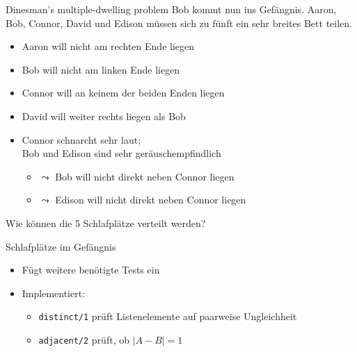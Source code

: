 \documentclass{beamer}
\newcommand{\code}[1]{
	\begin{mdframed}
		
	\end{mdframed}
}
\begin{document}
\begin{frame}{Dinesman's multiple-dwelling problem}
	Bob kommt nun ins Gefängnis.
	Aaron, Bob, Connor, David und Edison müssen sich zu fünft ein sehr breites Bett teilen.

	\begin{itemize}
		\item Aaron will nicht am rechten Ende liegen
		\item Bob will nicht am linken Ende liegen
		\item Connor will an keinem der beiden Enden liegen
		\item David will weiter rechts liegen als Bob
		\item Connor schnarcht sehr laut;\\Bob und Edison sind sehr geräuschempfindlich
		\begin{itemize}
			\item $\leadsto$ Bob will nicht direkt neben Connor liegen
			\item $\leadsto$ Edison will nicht direkt neben Connor liegen
		\end{itemize}
	\end{itemize}

	Wie können die 5 Schlafplätze verteilt werden?
\end{frame}

\begin{frame}{Schlafplätze im Gefängnis}
	\code{demos/schlafplaetze.pl}

	\begin{itemize}
		\item Fügt weitere benötigte Tests ein
		\item Implementiert:
		\begin{itemize}
			\item \texttt{distinct/1} prüft Listenelemente auf paarweise Ungleichheit
			\item \texttt{adjacent/2} prüft, ob $|A - B| = 1$
		\end{itemize}
	\end{itemize}
\end{frame}

\end{document}
